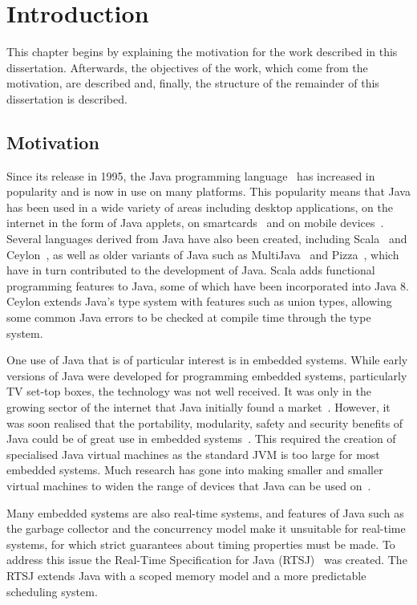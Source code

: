 
\chapter{Introduction}

This chapter begins by explaining the motivation for the work
described in this dissertation.
Afterwards, the objectives of the work, which come from the
motivation, are described and, finally, the structure of the remainder
of this dissertation is described.

\section{Motivation}

Since its release in 1995, the Java programming
language~\cite{gosling2013} has increased in popularity and is now in
use on many platforms.
This popularity means that Java has been used in a wide variety of
areas including desktop applications, on the internet in the form of
Java applets, on smartcards~\cite{chen2000} and on mobile
devices~\cite{oracle2014}.
Several languages derived from Java have also been created, including
Scala~\cite{lausanne2015} and Ceylon~\cite{redhat2015}, as well as
older variants of Java such as MultiJava~\cite{clifton2006} and
Pizza~\cite{odersky1997}, which have in turn contributed to the
development of Java.
Scala adds functional programming features to Java, some of which have
been incorporated into Java 8.
Ceylon extends Java's type system with features such as union types,
allowing some common Java errors to be checked at compile time through
the type system.

One use of Java that is of particular interest is in embedded systems.
While early versions of Java were developed for programming embedded
systems, particularly TV set-top boxes, the technology was not well
received.
It was only in the growing sector of the internet that Java initially
found a market~\cite{horstmann2002}.
However, it was soon realised that the portability, modularity, safety
and security benefits of Java could be of great use in embedded
systems~\cite{mulchandani1998}.
This required the creation of specialised Java virtual machines as the
standard JVM is too large for most embedded systems.
Much research has gone into making smaller and smaller virtual
machines to widen the range of devices that Java can be used
on~\cite{caska2011,thomm2010}.

Many embedded systems are also real-time systems, and features of Java
such as the garbage collector and the concurrency model make it
unsuitable for real-time systems, for which strict guarantees about
timing properties must be made.
To address this issue the Real-Time Specification for Java
(RTSJ)~\cite{gosling2000} was created.
The RTSJ extends Java with a scoped memory model and a more
predictable scheduling system.

